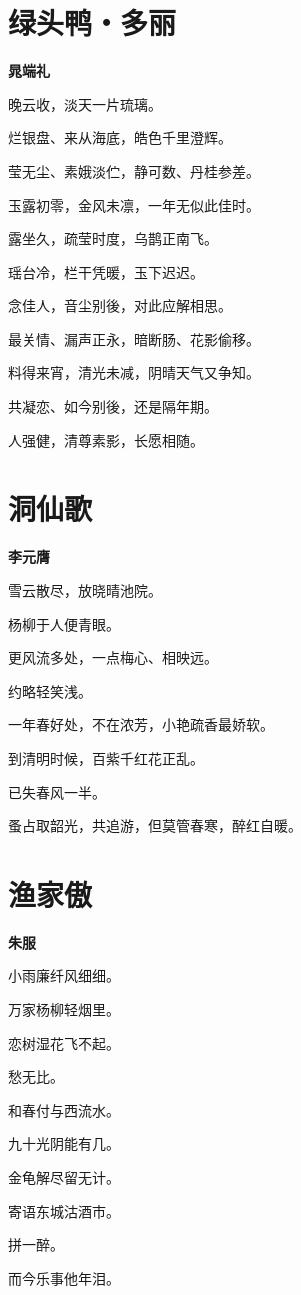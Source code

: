 \documentclass[12pt,a4paper]{ctexbook}
\begin{document}
\section{绿头鸭・多丽}
\textbf{晁端礼}\par\vspace{0.5em}
晚云收，淡天一片琉璃。\par
烂银盘、来从海底，皓色千里澄辉。\par
莹无尘、素娥淡伫，静可数、丹桂参差。\par
玉露初零，金风未凛，一年无似此佳时。\par
露坐久，疏莹时度，乌鹊正南飞。\par
瑶台冷，栏干凭暖，玉下迟迟。\par
念佳人，音尘别後，对此应解相思。\par
最关情、漏声正永，暗断肠、花影偷移。\par
料得来宵，清光未减，阴晴天气又争知。\par
共凝恋、如今别後，还是隔年期。\par
人强健，清尊素影，长愿相随。\par

\section{洞仙歌}
\textbf{李元膺}\par\vspace{0.5em}
雪云散尽，放晓晴池院。\par
杨柳于人便青眼。\par
更风流多处，一点梅心、相映远。\par
约略轻笑浅。\par
一年春好处，不在浓芳，小艳疏香最娇软。\par
到清明时候，百紫千红花正乱。\par
已失春风一半。\par
蚤占取韶光，共追游，但莫管春寒，醉红自暖。\par

\section{渔家傲}
\textbf{朱服}\par\vspace{0.5em}
小雨廉纤风细细。\par
万家杨柳轻烟里。\par
恋树湿花飞不起。\par
愁无比。\par
和春付与西流水。\par
九十光阴能有几。\par
金龟解尽留无计。\par
寄语东城沽酒市。\par
拼一醉。\par
而今乐事他年泪。\par
\end{document}
